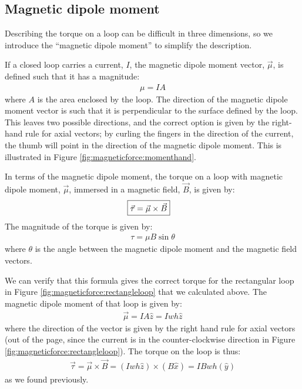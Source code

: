 \subsection{Magnetic dipole moment}
\label{sec:MagneticForce:dipolemoment}
Describing the torque on a loop can be difficult in three dimensions, so we introduce the ``magnetic dipole moment'' to simplify the description.

If a closed loop carries a current, $I$, the magnetic dipole moment vector, $\vec \mu$, is defined such that it has a magnitude:
\begin{align*}
\mu = IA
\end{align*}
where $A$ is the area enclosed by the loop. The direction of the magnetic dipole moment vector is such that it is perpendicular to the surface defined by the loop. This leaves two possible directions, and the correct option is given by the right-hand rule for axial vectors; by curling the fingers in the direction of the current, the thumb will point in the direction of the magnetic dipole moment. This is illustrated in Figure \ref{fig:magneticforce:momenthand}.

In terms of the magnetic dipole moment, the torque on a loop with magnetic dipole moment, $\vec \mu$, immersed in a magnetic field, $\vec B$, is given by:
\begin{align*}
\Aboxed{\vec \tau = \vec \mu \times \vec B}
\end{align*}
The magnitude of the torque is given by:
\begin{align*}
\tau =\mu B \sin\theta
\end{align*}
where $\theta$ is the angle between the magnetic dipole moment and the magnetic field vectors.

We can verify that this formula gives the correct torque for the rectangular loop in Figure \ref{fig:magneticforce:rectangleloop} that we calculated above. The magnetic dipole moment of that loop is given by:
\begin{align*}
\vec \mu = IA \hat z = Iwh\hat z
\end{align*}
where the direction of the vector is given by the right hand rule for axial vectors (out of the page, since the current is in the counter-clockwise direction in Figure \ref{fig:magneticforce:rectangleloop}). The torque on the loop is thus:
\begin{align*}
\vec \tau = \vec \mu \times \vec B = (Iwh\hat z) \times (B\hat x) = IBwh (\hat y)
\end{align*}
as we found previously.

